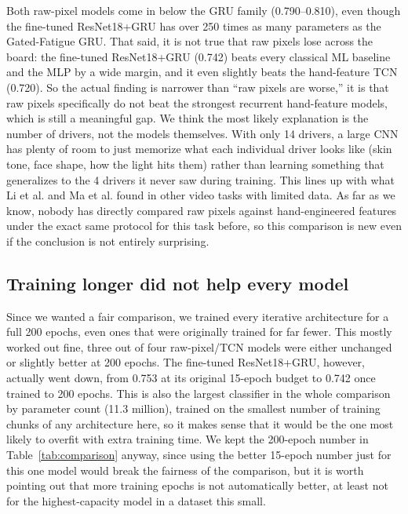 \documentclass[conference]{IEEEtran}
\begin{document}
Both raw-pixel models come in below the GRU family (0.790--0.810), even though the fine-tuned ResNet18+GRU has over 250 times as many parameters as the Gated-Fatigue GRU. That said, it is not true that raw pixels lose across the board: the fine-tuned ResNet18+GRU (0.742) beats every classical ML baseline and the MLP by a wide margin, and it even slightly beats the hand-feature TCN (0.720). So the actual finding is narrower than ``raw pixels are worse,'' it is that raw pixels specifically do not beat the strongest recurrent hand-feature models, which is still a meaningful gap. We think the most likely explanation is the number of drivers, not the models themselves. With only 14 drivers, a large CNN has plenty of room to just memorize what each individual driver looks like (skin tone, face shape, how the light hits them) rather than learning something that generalizes to the 4 drivers it never saw during training. This lines up with what Li et al. \cite{b_imagepretrain} and Ma et al. \cite{b_ma2022} found in other video tasks with limited data. As far as we know, nobody has directly compared raw pixels against hand-engineered features under the exact same protocol for this task before, so this comparison is new even if the conclusion is not entirely surprising.

\subsection{Training longer did not help every model}

Since we wanted a fair comparison, we trained every iterative architecture for a full 200 epochs, even ones that were originally trained for far fewer. This mostly worked out fine, three out of four raw-pixel/TCN models were either unchanged or slightly better at 200 epochs. The fine-tuned ResNet18+GRU, however, actually went down, from 0.753 at its original 15-epoch budget to 0.742 once trained to 200 epochs. This is also the largest classifier in the whole comparison by parameter count (11.3 million), trained on the smallest number of training chunks of any architecture here, so it makes sense that it would be the one most likely to overfit with extra training time. We kept the 200-epoch number in Table~\ref{tab:comparison} anyway, since using the better 15-epoch number just for this one model would break the fairness of the comparison, but it is worth pointing out that more training epochs is not automatically better, at least not for the highest-capacity model in a dataset this small.
\end{document}
